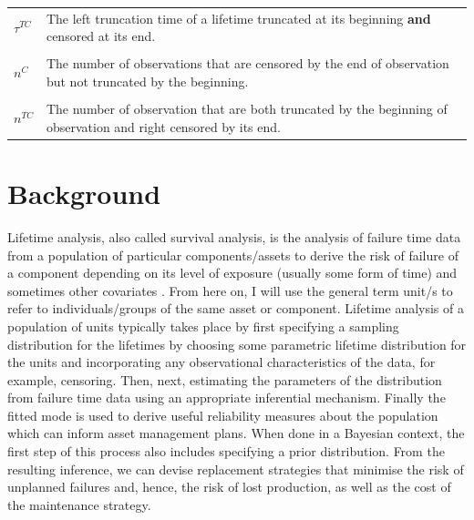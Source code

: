 \begin{table}
\begin{tabularx}{\textwidth}{lY}
    $\tau^{TC}$ & The left truncation time of a lifetime truncated at its beginning \textbf{and} censored at its end.\\
     & \\
    $n^C$ & The number of observations that are censored by the end of observation but not truncated by the beginning.\\
     & \\
    $n^{TC}$ & The number of observation that are both truncated by the beginning of observation and right censored by its end.\\

    \bottomrule
    \end{tabularx}
\end{table}
    

\section{Background} \label{sec:lifetime-data-background}

Lifetime analysis, also called survival analysis, is the analysis of failure time data from a population of particular components/assets to derive the risk of failure of a component depending on its level of exposure (usually some form of time) and sometimes other covariates \citep{moore2016}. From here on, I will use the general term unit/s to refer to individuals/groups of the same asset or component. Lifetime analysis of a population of units typically takes place by first specifying a sampling distribution for the lifetimes by choosing some parametric lifetime distribution for the units and incorporating any observational characteristics of the data, for example, censoring. Then, next, estimating the parameters of the distribution from failure time data using an appropriate inferential mechanism. Finally the fitted mode is used to derive useful reliability measures about the population which can inform asset management plans. When done in a Bayesian context, the first step of this process also includes specifying a prior distribution. From the resulting inference, we can devise replacement strategies that minimise the risk of unplanned failures and, hence, the risk of lost production, as well as the cost of the maintenance strategy.

